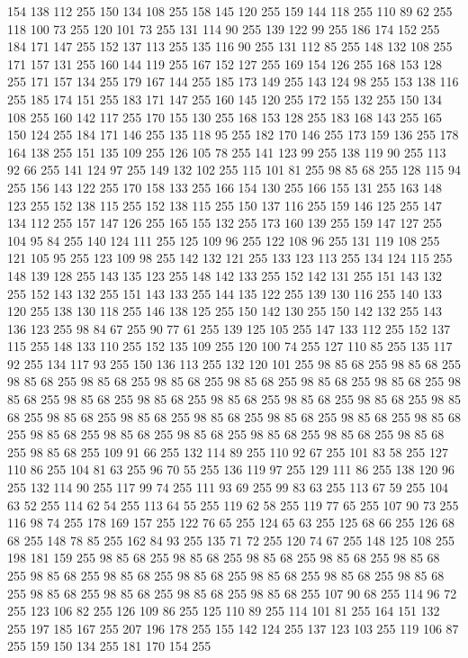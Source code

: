154 138 112 255 150 134 108 255 158 145 120 255 159 144 118 255 110 89 62 255 118 100 73 255 120 101 73 255 131 114 90 255 139 122 99 255 186 174 152 255 184 171 147 255 152 137 113 255 135 116 90 255 131 112 85 255 148 132 108 255 171 157 131 255 160 144 119 255 167 152 127 255 169 154 126 255 168 153 128 255 171 157 134 255 179 167 144 255 185 173 149 255 143 124 98 255 153 138 116 255 185 174 151 255 183 171 147 255 160 145 120 255 172 155 132 255 150 134 108 255 160 142 117 255 170 155 130 255 168 153 128 255 183 168 143 255 165 150 124 255 184 171 146 255 135 118 95 255 182 170 146 255 173 159 136 255 178 164 138 255 151 135 109 255 126 105 78 255 141 123 99 255 138 119 90 255 113 92 66 255 141 124 97 255 149 132 102 255 115 101 81 255 98 85 68 255 128 115 94 255 156 143 122 255 170 158 133 255 166 154 130 255 166 155 131 255 163 148 123 255 152 138 115 255 152 138 115 255 150 137 116 255 159 146 125 255 147 134 112 255 157 147 126 255 165 155 132 255 173 160 139 255 159 147 127 255
104 95 84 255 140 124 111 255 125 109 96 255 122 108 96 255 131 119 108 255 121 105 95 255 123 109 98 255 142 132 121 255 133 123 113 255 134 124 115 255 148 139 128 255 143 135 123 255 148 142 133 255 152 142 131 255 151 143 132 255 152 143 132 255 151 143 133 255 144 135 122 255 139 130 116 255 140 133 120 255 138 130 118 255 146 138 125 255 150 142 130 255 150 142 132 255 143 136 123 255 98 84 67 255 90 77 61 255 139 125 105 255 147 133 112 255 152 137 115 255 148 133 110 255 152 135 109 255 120 100 74 255 127 110 85 255 135 117 92 255 134 117 93 255 150 136 113 255 132 120 101 255 98 85 68 255 98 85 68 255 98 85 68 255 98 85 68 255 98 85 68 255 98 85 68 255 98 85 68 255 98 85 68 255 98 85 68 255 98 85 68 255 98 85 68 255 98 85 68 255 98 85 68 255 98 85 68 255 98 85 68 255 98 85 68 255 98 85 68 255 98 85 68 255 98 85 68 255 98 85 68 255 98 85 68 255 98 85 68 255 98 85 68 255 98 85 68 255 98 85 68 255 98 85 68 255
98 85 68 255 98 85 68 255 109 91 66 255 132 114 89 255 110 92 67 255 101 83 58 255 127 110 86 255 104 81 63 255 96 70 55 255 136 119 97 255 129 111 86 255 138 120 96 255 132 114 90 255 117 99 74 255 111 93 69 255 99 83 63 255 113 67 59 255 104 63 52 255 114 62 54 255 113 64 55 255 119 62 58 255 119 77 65 255 107 90 73 255 116 98 74 255 178 169 157 255 122 76 65 255 124 65 63 255 125 68 66 255 126 68 68 255 148 78 85 255 162 84 93 255 135 71 72 255 120 74 67 255 148 125 108 255 198 181 159 255 98 85 68 255 98 85 68 255 98 85 68 255 98 85 68 255 98 85 68 255 98 85 68 255 98 85 68 255 98 85 68 255 98 85 68 255 98 85 68 255 98 85 68 255 98 85 68 255 98 85 68 255 98 85 68 255 98 85 68 255 107 90 68 255 114 96 72 255 123 106 82 255 126 109 86 255 125 110 89 255 114 101 81 255 164 151 132 255 197 185 167 255 207 196 178 255 155 142 124 255 137 123 103 255 119 106 87 255 159 150 134 255 181 170 154 255
